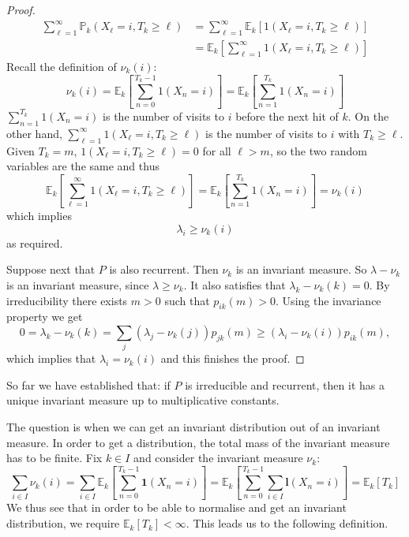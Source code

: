 \documentclass[a4paper]{article}
\begin{document}
\begin{proof}
\begin{align*}
        \sum_{\ell=1}^{\infty} \mathbb{P}_k\left(X_{\ell}=i, T_k \geq \ell\right) &= \sum_{\ell=1}^{\infty} \mathbb{E}_k\left[ 1(X_{\ell}=i, T_k \geq \ell) \right]\\ 
        &= \mathbb{E}_k\left[ \sum_{\ell=1}^{\infty} 1(X_{\ell}=i, T_k \geq \ell) \right]
    \end{align*}
    Recall the definition of $\nu_k(i)$: 
    \[
        \nu_k(i)=\mathbb{E}_k\left[\sum_{n=0}^{T_k-1} 1\left(X_n=i\right)\right]=\mathbb{E}_k\left[\sum_{n=1}^{T_k} 1\left(X_n=i\right)\right]
    \]
    $ \sum_{n=1}^{T_k} 1\left(X_n=i\right) $ is the number of visits to $i$ before the next hit of $k$. On the other hand, $\sum_{\ell=1}^{\infty} 1(X_{\ell}=i, T_k \geq \ell)$ is the number of visits to $i$ with $ T_k\ge \ell $. Given $T_k=m$, $ 1(X_{\ell}=i, T_k \geq \ell)=0 $ for all $\ell > m$, so the two random variables are the same and thus 
    \[
        \mathbb{E}_k\left[ \sum_{\ell=1}^{\infty} 1(X_{\ell}=i, T_k \geq \ell) \right] = \mathbb{E}_k\left[\sum_{n=1}^{T_k} 1\left(X_n=i\right)\right] = \nu_k(i)
    \]
    which implies 
    \[
        \lambda_i\ge \nu_k(i)
    \]
    as required. 

    Suppose next that $P$ is also recurrent. Then $\nu_k$ is an invariant measure. So $\lambda-\nu_k$ is an invariant measure, since $\lambda \geq \nu_k$. It also satisfies that $\lambda_k-\nu_k(k)=0$. By irreducibility there exists $m>0$ such that $p_{i k}(m)>0$. Using the invariance property we get
    \[
    0=\lambda_k-\nu_k(k)=\sum_j\left(\lambda_j-\nu_k(j)\right) p_{j k}(m) \geq\left(\lambda_i-\nu_k(i)\right) p_{i k}(m),
    \]
    which implies that $\lambda_i=\nu_k(i)$ and this finishes the proof.
\end{proof}

So far we have established that: if $P$ is irreducible and recurrent, then it has a unique invariant measure up to multiplicative constants. 

The question is when we can get an invariant distribution out of an invariant measure. In order to get a distribution, the total mass of the invariant measure has to be finite. Fix $k \in I$ and consider the invariant measure $\nu_k$:
\[
\sum_{i \in I} \nu_k(i)=\sum_{i \in I} \mathbb{E}_k\left[\sum_{n=0}^{T_k-1} \mathbf{1}\left(X_n=i\right)\right]=\mathbb{E}_k\left[\sum_{n=0}^{T_k-1} \sum_{i \in I} \mathbf{l}\left(X_n=i\right)\right]=\mathbb{E}_k\left[T_k\right]
\]
We thus see that in order to be able to normalise and get an invariant distribution, we require $\mathbb{E}_k\left[T_k\right]<\infty$. This leads us to the following definition.
\end{document}
